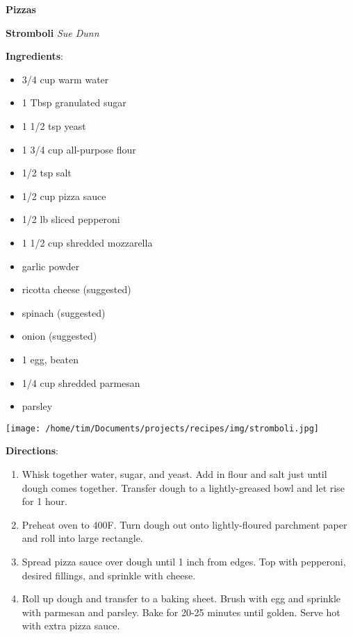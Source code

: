 \documentclass[11pt, twoside, openany]{book}
\begin{document}
{\newpage \LARGE \textbf{Pizzas}} \label{pizzas}\vspace{4mm}\\
\noindent\begin{minipage}[t]{\linewidth}%
{\Large\textbf{Stromboli}} \label{stromboli}\hfill\textit{Sue Dunn}\\
\noindent\begin{minipage}[t]{0.78\linewidth}%
\textbf{Ingredients}:\vspace{-3mm}
\begin{multicols}{2}
\begin{itemize}\setlength\itemsep{-1mm}
\item 3/4 cup warm water
\item 1 Tbsp granulated sugar
\item 1 1/2 tsp yeast
\item 1 3/4 cup all-purpose flour
\item 1/2 tsp salt
\item 1/2 cup pizza sauce
\item 1/2 lb sliced pepperoni
\item 1 1/2 cup shredded mozzarella
\item garlic powder
\item ricotta cheese (suggested)
\item spinach (suggested)
\item onion (suggested)
\item 1 egg, beaten
\item 1/4 cup shredded parmesan
\item parsley
\end{itemize}
\end{multicols}
\end{minipage}
\noindent\begin{minipage}[t]{0.18\linewidth}
\centering \strut\vspace*{-\baselineskip}\newline
\texttt{[image: /home/tim/Documents/projects/recipes/img/stromboli.jpg]}\\
\end{minipage}\vspace{3mm}
\textbf{Directions}:
\vspace{-3mm}\begin{enumerate}\setlength\itemsep{-1mm}
\item Whisk together water, sugar, and yeast. Add in flour and salt just until dough comes together. Transfer dough to a lightly-greased bowl and let rise for 1 hour.
\item Preheat oven to 400F. Turn dough out onto lightly-floured parchment paper and roll into large rectangle.
\item Spread pizza sauce over dough until 1 inch from edges. Top with pepperoni, desired fillings, and sprinkle with cheese.
\item Roll up dough and transfer to a baking sheet. Brush with egg and sprinkle with parmesan and parsley. Bake for 20-25 minutes until golden. Serve hot with extra pizza sauce.
\end{enumerate}
\end{minipage}\vspace{8mm}
\end{document}
